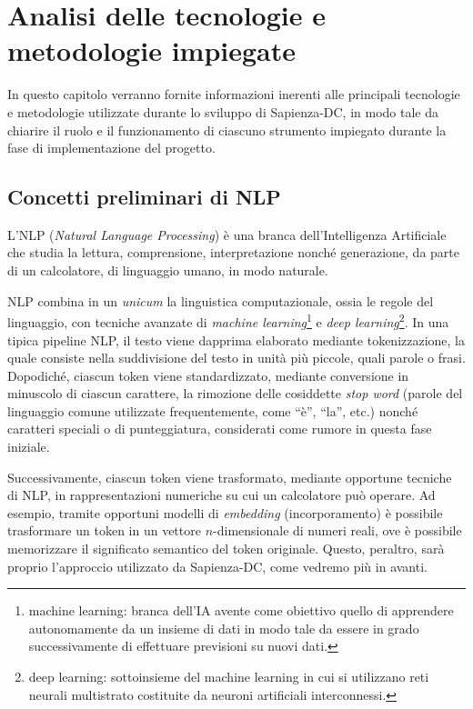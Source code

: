 \chapter{Analisi delle tecnologie e metodologie impiegate}

In questo capitolo verranno fornite informazioni inerenti alle principali tecnologie e metodologie utilizzate durante lo sviluppo di Sapienza-DC, in modo tale da chiarire il ruolo e il funzionamento di ciascuno strumento impiegato durante la fase di implementazione del progetto.

\section{Concetti preliminari di NLP}
L'NLP (\textit{Natural Language Processing}) è una branca dell'Intelligenza Artificiale che studia la lettura, comprensione, interpretazione nonché generazione, da parte di un calcolatore, di linguaggio umano, in modo naturale.

NLP combina in un \textit{unicum} la linguistica computazionale, ossia le regole del linguaggio, con tecniche avanzate di \textit{machine learning}\footnote{machine learning: branca dell'IA avente come obiettivo quello di apprendere autonomamente da un insieme di dati in modo tale da essere in grado successivamente di effettuare previsioni su nuovi dati. } e \textit{deep learning}\footnote{deep learning: sottoinsieme del machine learning in cui si utilizzano reti neurali multistrato costituite da neuroni artificiali interconnessi. }. In una tipica pipeline NLP, il testo viene dapprima elaborato mediante tokenizzazione, la quale consiste nella suddivisione del testo in unità più piccole, quali parole o frasi. Dopodiché, ciascun token viene standardizzato, mediante conversione in minuscolo di ciascun carattere, la rimozione delle cosiddette \textit{stop word} (parole del linguaggio comune utilizzate frequentemente, come ``è'', ``la'', etc.) nonché caratteri speciali o di punteggiatura, considerati come rumore in questa fase iniziale.

Successivamente, ciascun token viene trasformato, mediante opportune tecniche di NLP, in rappresentazioni numeriche su cui un calcolatore può operare. Ad esempio, tramite opportuni modelli di \textit{embedding} (incorporamento) è possibile trasformare un token in un vettore $n$-dimensionale di numeri reali, ove è possibile memorizzare il significato semantico del token originale. Questo, peraltro, sarà proprio l'approccio utilizzato da Sapienza-DC, come vedremo più in avanti.

